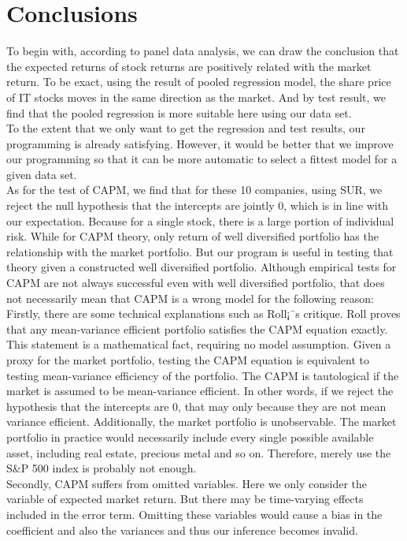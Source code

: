     \section{Conclusions}
    \noindent To begin with, according to panel data analysis, we can draw the conclusion that the expected returns of stock returns are positively related with the market return. To be exact, using the result of pooled regression model, the share price of IT stocks moves in the same direction as the market. And by test result, we find that the pooled regression is more suitable here using our data set.\\
[\baselineskip] \indent To the extent that we only want to get the regression and test results, our programming is already satisfying. However, it would be better that we improve our programming so that it can be more automatic to select a fittest model for a given data set.\\
[\baselineskip] \indent As for the test of CAPM, we find that for these 10 companies, using SUR, we reject the null hypothesis that the intercepts are jointly 0, which is in line with our expectation. Because for a single stock, there is a large portion of individual risk. While for CAPM theory, only return of well diversified portfolio has the relationship with the market portfolio. But our program is useful in testing that theory given a constructed well diversified portfolio. Although empirical tests for CAPM are not always successful even with well diversified portfolio, that does not necessarily mean that CAPM is a wrong model for the following reason:\\
[\baselineskip] \indent Firstly, there are some technical explanations such as Roll¡¯s critique. Roll proves that any mean-variance efficient portfolio satisfies the CAPM equation exactly. This statement is a mathematical fact, requiring no model assumption. Given a proxy for the market portfolio, testing the CAPM equation is equivalent to testing mean-variance efficiency of the portfolio. The CAPM is tautological if the market is assumed to be mean-variance efficient. In other words, if we reject the hypothesis that the intercepts are 0, that may only because they are not mean variance efficient. Additionally, the market portfolio is unobservable. The market portfolio in practice would necessarily include every single possible available asset, including real estate, precious metal and so on. Therefore, merely use the S\&P 500 index is probably not enough.\\
[\baselineskip] \indent Secondly, CAPM suffers from omitted variables. Here we only consider the variable of expected market return. But there may be time-varying effects included in the error term. Omitting these variables would cause a bias in the coefficient and also the variances and thus our inference becomes invalid.\\
